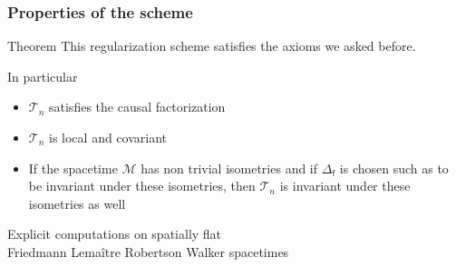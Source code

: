 \documentclass[9pt]{beamer}
\newcommand{\Mcal}{\mathcal{M}}
\newcommand{\Tcal}{\mathcal{T}}
\newcommand{\fsf}{\mathsf{f}}
\begin{document}
\begin{frame}

\frametitle{Properties of the scheme}

\vfill
 
\begin{exampleblock}{Theorem}
\vspace*{-4pt}
This regularization scheme satisfies the axioms we asked before.
\end{exampleblock}
 
\vfill 

In particular 

\begin{itemize}
\item $\Tcal_n$ satisfies the causal factorization

\item $\Tcal_n$ is local and covariant

\item If the spacetime $\Mcal$ has non trivial isometries and if $\Delta_\fsf$ is chosen such as to be invariant under these isometries, then $\Tcal_n$ is invariant under these isometries as well
\end{itemize}


\vfill
 
\end{frame}


{
\begin{frame}
\bf
\begin{exampleblock}{\vspace*{-3ex}}
\begin{center}
\Large Explicit computations on spatially flat \\[10pt] Friedmann Lemaître Robertson Walker spacetimes
\end{center}
\end{exampleblock}
\end{frame}
}
\end{document}
